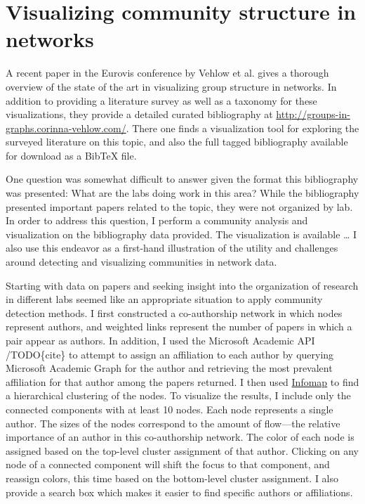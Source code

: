 \hypertarget{visualization}{\section{Visualizing community structure in
networks}\label{visualization}}

\protect\hyperlink{visualization}{}

A recent paper in the Eurovis conference by Vehlow et al.
\autocite{vehlow_state_2015} gives a thorough overview of the state of
the art in visualizing group structure in networks. In addition to
providing a literature survey as well as a taxonomy for these
visualizations, they provide a detailed curated bibliography at
\url{http://groups-in-graphs.corinna-vehlow.com/}. There one finds a
visualization tool for exploring the surveyed literature on this topic,
and also the full tagged bibliography available for download as a BibTeX
file.

One question was somewhat difficult to answer given the format this
bibliography was presented: What are the labs doing work in this area?
While the bibliography presented important papers related to the topic,
they were not organized by lab. In order to address this question, I
perform a community analysis and visualization on the bibliography data
provided. The visualization is available \ldots{} I also use this
endeavor as a first-hand illustration of the utility and challenges
around detecting and visualizing communities in network data.

Starting with data on papers and seeking insight into the organization
of research in different labs seemed like an appropriate situation to
apply community detection methods. I first constructed a co-authorship
network in which nodes represent authors, and weighted links represent
the number of papers in which a pair appear as authors. In addition, I
used the Microsoft Academic API /TODO\{cite\} to attempt to assign an
affiliation to each author by querying Microsoft Academic Graph for the
author and retrieving the most prevalent affiliation for that author
among the papers returned. I then used
\protect\hyperlink{the-dynamical-perspective}{Infomap} to find a
hierarchical clustering of the nodes. To visualize the results, I
include only the connected components with at least 10 nodes. Each node
represents a single author. The sizes of the nodes correspond to the
amount of flow---the relative importance of an author in this
co-authorship network. The color of each node is assigned based on the
top-level cluster assignment of that author. Clicking on any node of a
connected component will shift the focus to that component, and reassign
colors, this time based on the bottom-level cluster assignment. I also
provide a search box which makes it easier to find specific authors or
affiliations.

